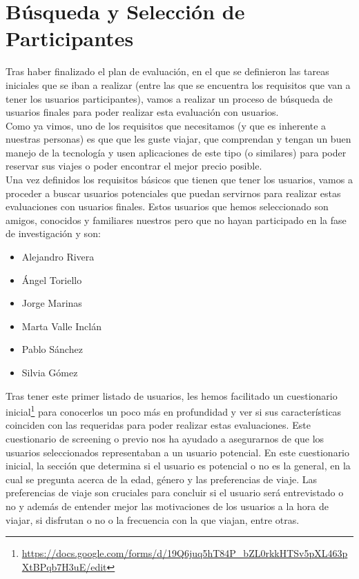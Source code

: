 \section{Búsqueda y Selección de Participantes}
Tras haber finalizado el plan de evaluación, en el que se definieron las tareas iniciales que se iban a realizar (entre las que se
encuentra los requisitos que van a tener los usuarios participantes), vamos a realizar un proceso de búsqueda de usuarios finales 
para poder realizar esta evaluación con usuarios. \\

Como ya vimos, uno de los requisitos que necesitamos (y que es inherente a nuestras personas) es que que les guste viajar, que comprendan
y tengan un buen manejo de la tecnología y usen aplicaciones de este tipo (o similares) para poder reservar sus viajes 
o poder encontrar el mejor precio posible. \\

Una vez definidos los requisitos básicos que tienen que tener los usuarios, vamos a proceder a buscar usuarios potenciales que puedan servirnos
para realizar estas evaluaciones con usuarios finales. Estos usuarios que hemos seleccionado son amigos, conocidos y familiares nuestros pero que no hayan
participado en la fase de investigación y son:
\begin{itemize}
    \item Alejandro Rivera
    \item Ángel Toriello
    \item Jorge Marinas
    \item Marta Valle Inclán
    \item Pablo Sánchez
    \item Silvia Gómez
\end{itemize}

Tras tener este primer listado de usuarios, les hemos facilitado un cuestionario inicial\footnote{\url{https://docs.google.com/forms/d/19Q6juq5hT84P_bZL0rkkHTSv5pXL463pXtBPqb7H3uE/edit}} para conocerlos un poco más en profundidad y ver si sus características
coinciden con las requeridas para poder realizar estas evaluaciones. Este cuestionario de screening o previo nos ha ayudado a asegurarnos de que los usuarios seleccionados representaban a un usuario potencial.
En este cuestionario inicial, la sección que determina si el usuario es potencial o no es la general, en la cual se pregunta acerca de la edad, género y las 
preferencias de viaje. Las preferencias de viaje son cruciales para concluir si el usuario será entrevistado o no y además de entender mejor las motivaciones 
de los usuarios a la hora de viajar, si disfrutan o no o la frecuencia con la que viajan, entre otras. \\

